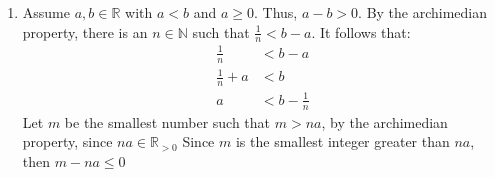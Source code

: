 \documentclass{article}
\theoremstyle{problem}
\theoremstyle{plain}
\theoremstyle{remark}
\begin{document}
\begin{enumerate}
    

\item 
  Assume $a,b \in \mathbb{R}$ with $a < b$ and $a \geq 0$. Thus, $a - b > 0$.
  By the archimedian property, there is an $n \in \mathbb{N}$ such that $\frac{1}{n} < b - a$.
  It follows that:
  \begin{align*}
    \frac{1}{n} &< b - a\\
    \frac{1}{n} + a &< b\\
    a &< b - \frac{1}{n}
  \end{align*}
  Let $m$ be the smallest number such that $m > na$, 
  by the archimedian property, since $na \in \mathbb{R}_{>0}$
  Since $m$ is the smallest integer greater than $na$, then $m - na \leq 0$
  
  
  


\end{enumerate}
\end{document}
